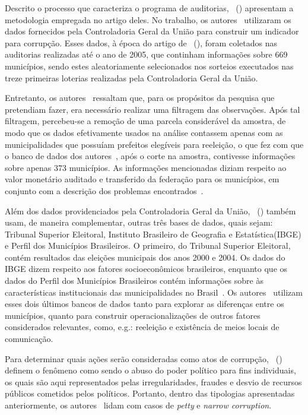\documentclass[
	12pt,				%
	openright,			%
	twoside,			%
	a4paper,			%
	openany,
	english,			%
	brazil				%
	]{abntex2}
\begin{document}
Descrito o processo que caracteriza o programa de auditorias, ~(\citeyear{ferraz2008exposing}) apresentam a metodologia empregada no artigo deles. No trabalho, os autores~\cite{ferraz2008exposing} utilizaram os dados fornecidos pela Controladoria Geral da União para construir um indicador para corrupção. Esses dados, à época do artigo de ~(\citeyear{ferraz2008exposing}), foram coletados nas auditorias realizadas até o ano de 2005, que continham informações sobre 669 municípios, sendo estes aleatoriamente selecionados nos sorteios executados nas treze primeiras loterias realizadas pela Controladoria Geral da União.

Entretanto, os autores~\cite{ferraz2008exposing} ressaltam que, para os propósitos da pesquisa que pretendiam fazer, era necessário realizar uma filtragem das observações. Após tal filtragem, percebeu-se a remoção de uma parcela considerável da amostra, de modo que os dados efetivamente usados na análise contassem apenas com as municipalidades que possuíam prefeitos elegíveis para reeleição, o que fez com que o banco de dados dos autores~\cite{ferraz2008exposing}, após o corte na amostra, contivesse informações sobre apenas 373 municípios. As informações mencionadas diziam respeito ao valor monetário auditado e transferido da federação para os municípios, em conjunto com a descrição dos problemas encontrados~\cite{ferraz2008exposing}.

Além dos dados providenciados pela Controladoria Geral da União, ~(\citeyear{ferraz2008exposing}) também usam, de maneira complementar, outras três bases de dados, quais sejam: Tribunal Superior Eleitoral, Instituto Brasileiro de Geografia e Estatística(IBGE) e Perfil dos Municípios Brasileiros. O primeiro, do Tribunal Superior Eleitoral, contém resultados das eleições municipais dos anos 2000 e 2004. Os dados do IBGE dizem respeito aos fatores socioeconômicos brasileiros, enquanto que os dados do Perfil dos Municípios Brasileiros contém informações sobre às características institucionais das municipalidades no Brasil~\cite{ferraz2008exposing}. Os autores~\cite{ferraz2008exposing} utilizam esses dois últimos bancos de dados tanto para explorar as diferenças entre os municípios, quanto para construir operacionalizações de outros fatores considerados relevantes, como, e.g.: reeleição e existência de meios locais de comunicação.

Para determinar quais ações serão consideradas como atos de corrupção, ~(\citeyear{ferraz2008exposing}) definem o fenômeno como sendo o abuso do poder político para fins individuais, os quais são aqui representados pelas irregularidades, fraudes e desvio de recursos públicos cometidos pelos políticos. Portanto, dentro das tipologias apresentadas anteriormente, os autores~\cite{ferraz2008exposing} lidam com casos de \textit{petty} e \textit{narrow corruption}.
\end{document}
